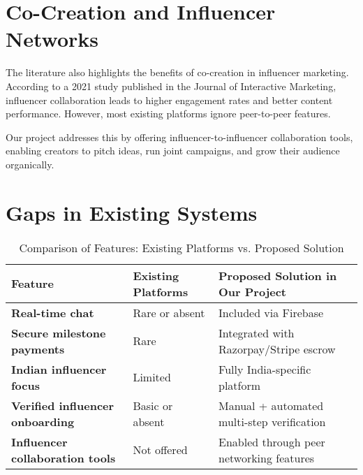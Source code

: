 \begin{justify}
\section{Co-Creation and Influencer Networks}
The literature also highlights the benefits of co-creation in influencer marketing. According to a 2021 study published in the Journal of Interactive Marketing, influencer collaboration leads to higher engagement rates and better content performance. However, most existing platforms ignore peer-to-peer features.
\par
Our project addresses this by offering influencer-to-influencer collaboration tools, enabling creators to pitch ideas, run joint campaigns, and grow their audience organically.

\section{Gaps in Existing Systems}


\begin{table}[h!]
\centering
\caption{Comparison of Features: Existing Platforms vs. Proposed Solution}
\begin{tabularx}{\textwidth}{>{\bfseries}l X X}
\toprule
Feature & Existing Platforms & Proposed Solution in Our Project \\
\midrule
Real-time chat & Rare or absent & Included via Firebase \\
Secure milestone payments & Rare & Integrated with Razorpay/Stripe escrow \\
Indian influencer focus & Limited & Fully India-specific platform \\
Verified influencer onboarding & Basic or absent & Manual + automated multi-step verification \\
Influencer collaboration tools & Not offered & Enabled through peer networking features \\
\bottomrule
\end{tabularx}
\end{table}


\end{justify}